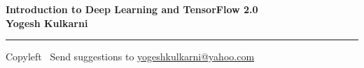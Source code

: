 
\graphicspath{{images/}}

\footnotesize


\begin{center}
\Large{\textbf{Introduction to Deep Learning and TensorFlow 2.0\\ Yogesh Kulkarni}}  
\end{center}

\begin{multicols}{2}
% 

\end{multicols}

\rule{\linewidth}{0.25pt}
\scriptsize
Copyleft \textcopyleft\  Send suggestions to 
\href{http://yati.io}{yogeshkulkarni@yahoo.com}


